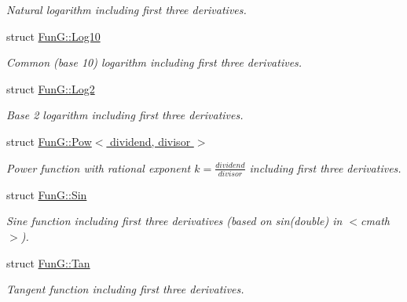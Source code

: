 \begin{DoxyCompactItemize}
\begin{DoxyCompactList}\small\item\em \-Natural logarithm including first three derivatives. \end{DoxyCompactList}\item 
struct \hyperlink{structFunG_1_1Log10}{\-Fun\-G\-::\-Log10}
\begin{DoxyCompactList}\small\item\em \-Common (base 10) logarithm including first three derivatives. \end{DoxyCompactList}\item 
struct \hyperlink{structFunG_1_1Log2}{\-Fun\-G\-::\-Log2}
\begin{DoxyCompactList}\small\item\em \-Base 2 logarithm including first three derivatives. \end{DoxyCompactList}\item 
struct \hyperlink{structFunG_1_1Pow}{\-Fun\-G\-::\-Pow$<$ dividend, divisor $>$}
\begin{DoxyCompactList}\small\item\em \-Power function with rational exponent $ k = \frac{dividend}{divisor} $ including first three derivatives. \end{DoxyCompactList}\item 
struct \hyperlink{structFunG_1_1Sin}{\-Fun\-G\-::\-Sin}
\begin{DoxyCompactList}\small\item\em \-Sine function including first three derivatives (based on sin(double) in $<$cmath$>$). \end{DoxyCompactList}\item 
struct \hyperlink{structFunG_1_1Tan}{\-Fun\-G\-::\-Tan}
\begin{DoxyCompactList}\small\item\em \-Tangent function including first three derivatives. \end{DoxyCompactList}\end{DoxyCompactItemize}
